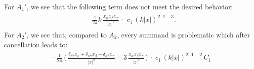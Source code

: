 For $A_1'$, we see that the following term does not meet the desired behavior:
\begin{align}
  \label{eq:Q2}
  \tag{Q2}
  \begin{alignedat}{1}
  &- \frac{1}{2 \pi } k \, \frac{x_\alpha x_\beta x_\gamma}{|x|^3} \; \cdot \; c_1 \, (k|x|)^{2 \cdot 1 - 3}. 
  \end{alignedat}
\end{align}
For $A_2'$, we see that, compared to $A_2$, every summand is problematic which after cancellation leads to:
\begin{align}
  \label{eq:Q3}
  \tag{Q3}
  \begin{alignedat}{1}
  &- \frac{1}{2\pi} \, \bigg(\,\frac{\delta_{\beta\gamma} x_\alpha + \delta_{\alpha \gamma} x_\beta + \delta_{\alpha \beta} x_\gamma}{|x|^2} - 3\, \frac{x_\alpha x_\beta x_\gamma}{|x|^4} \, \bigg) 
    \,\cdot \; c_1 \, (k|x|)^{2\cdot 1 - 2} \, C_1 \\[1.0em]

\end{alignedat}
\end{align}

